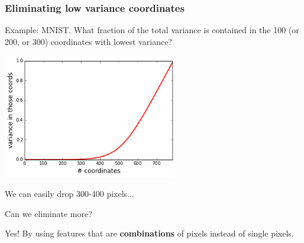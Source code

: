 \documentclass[smaller,handout]{beamer}
\def\E{{\mathbb E}}
\def\darkred{\color{red!70!black}}
\def\v2{{\vskip.2in}}
\def\E{{\mathbb E}}
\begin{document}
\begin{frame}
\frametitle{Eliminating low variance coordinates}

{\darkred Example: MNIST. What fraction of the total variance is contained in the 100 (or 200, or 300) coordinates with lowest variance?}

\pause\v2

\begin{center}
\includegraphics[width=3in]{mnistvar.png}
\end{center}

\pause
We can easily drop 300-400 pixels...

\pause
Can we eliminate more?

\pause
\alert{Yes! By using features that are {\bf combinations} of pixels instead of single pixels.}
\end{frame}

\end{document}
